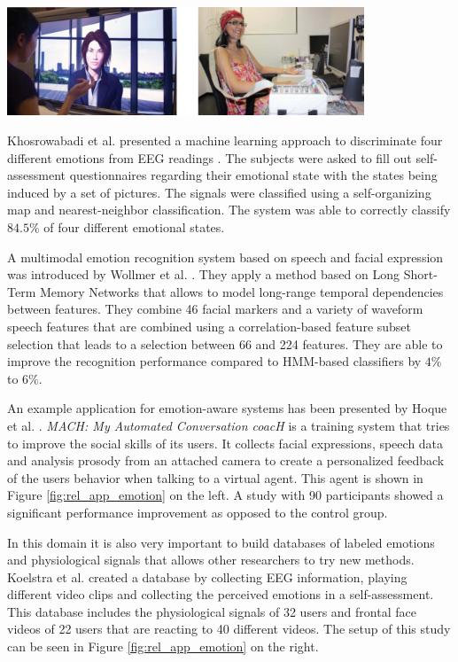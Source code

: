 \begin{minipage}{\linewidth}
\centering
\includegraphics[width=0.8\textwidth]{images/rel_app_emotion}
\label{fig:rel_app_emotion}
\end{minipage}

Khosrowabadi et al. presented a machine learning approach to discriminate four different emotions from EEG readings \cite{khosrowabadi2010eeg}. The subjects were asked to fill out self-assessment questionnaires regarding their emotional state with the states being induced by a set of pictures. The signals were classified using a self-organizing map and nearest-neighbor classification. The system was able to correctly classify $84.5\%$ of four different emotional states.

A multimodal emotion recognition system based on speech and facial expression was introduced by Wollmer et al.  \cite{wollmer2010context}. They apply a method based on Long Short-Term Memory Networks that allows to model long-range temporal dependencies between features. They combine 46 facial markers and a variety of waveform speech features that are combined using a correlation-based feature subset selection that leads to a selection between 66 and 224 features. They are able to improve the recognition performance compared to HMM-based classifiers by $4\%$ to $6\%$.

An example application for emotion-aware systems has been presented by Hoque et al. \cite{hoque2013mach}. \emph{MACH: My Automated Conversation coacH} is a training system that tries to improve the social skills of its users. It collects facial expressions, speech data and analysis prosody from an attached camera to create a personalized feedback of the users behavior when talking to a virtual agent. This agent is shown in Figure \ref{fig:rel_app_emotion} on the left. A study with 90 participants showed a significant performance improvement as opposed to the control group. 

In this domain it is also very important to build databases of labeled emotions and physiological signals that allows other researchers to try new methods. Koelstra et al. \cite{koelstra2012deap} created a database by collecting EEG information, playing different video clips and collecting the perceived emotions in a self-assessment. This database includes the physiological signals of 32 users and frontal face videos of 22 users that are reacting to 40 different videos. The setup of this study can be seen in Figure \ref{fig:rel_app_emotion} on the right.

